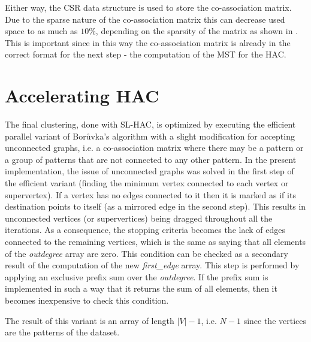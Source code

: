 Either way, the CSR data structure is used to store the co-association matrix. 
Due to the sparse nature of the co-association matrix this can decrease used space to as much as $10\%$, depending on the sparsity of the matrix as shown in \cite{Lourenco2010}. 
This is important since in this way the co-association matrix is already in the correct format for the next step - the computation of the MST for the HAC.

\section{Accelerating HAC}

The final clustering, done with SL-HAC, is optimized by executing the efficient parallel variant of Borůvka's algorithm \cite{Sousa2015} with a slight modification for accepting unconnected graphs, i.e. a co-association matrix where there may be a pattern or a group of patterns that are not connected to any other pattern.
In the present implementation, the issue of unconnected graphs was solved in the first step of the efficient variant (finding the minimum vertex connected to each vertex or supervertex). If a vertex has no edges connected to it then it is marked as if its destination points to itself (as a mirrored edge in the second step). This results in unconnected vertices (or supervertices) being dragged throughout all the iterations.
As a consequence, the stopping criteria becomes the lack of edges connected to the remaining vertices, which is the same as saying that all elements of the \emph{outdegree} array are zero. This condition can be checked as a secondary result of the computation of the new \emph{first\_edge} array. This step is performed by applying an exclusive prefix sum over the \emph{outdegree}. If the prefix sum is implemented in such a way that it returns the sum of all elements, then it becomes inexpensive to check this condition.

The result of this variant is an array of length $|V|-1$, i.e. $N-1$ since the vertices are the patterns of the dataset. 



